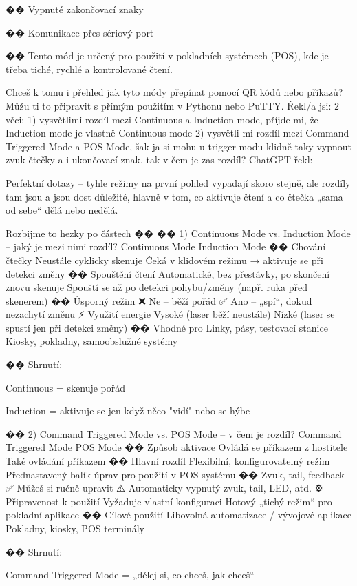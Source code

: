         �� Vypnuté zakončovací znaky

        �� Komunikace přes sériový port

�� Tento mód je určený pro použití v pokladních systémech (POS), kde je třeba tiché, rychlé a kontrolované čtení.

Chceš k tomu i přehled jak tyto módy přepínat pomocí QR kódů nebo příkazů? Můžu ti to připravit s přímým použitím v Pythonu nebo PuTTY.
Řekl/a jsi:
2 věci:
1) vysvětlimi rozdíl mezi Continuous a Induction mode, příjde mi, že Induction mode je vlastně Continuous mode
2) vysvětli mi rozdíl mezi Command Triggered Mode a POS Mode, šak ja si mohu u trigger modu klidně taky vypnout zvuk čtečky a i ukončovací znak, tak v čem je zas rozdíl?
ChatGPT řekl:

Perfektní dotazy – tyhle režimy na první pohled vypadají skoro stejně, ale rozdíly tam jsou a jsou dost důležité, hlavně v tom, co aktivuje čtení a co čtečka „sama od sebe“ dělá nebo nedělá.

Rozbijme to hezky po částech ��
�� 1) Continuous Mode vs. Induction Mode – jaký je mezi nimi rozdíl?
	Continuous Mode	Induction Mode
�� Chování čtečky	Neustále cyklicky skenuje	Čeká v klidovém režimu → aktivuje se při detekci změny
�� Spouštění čtení	Automatické, bez přestávky, po skončení znovu skenuje	Spouští se až po detekci pohybu/změny (např. ruka před skenerem)
�� Úsporný režim	❌ Ne – běží pořád	✅ Ano – „spí“, dokud nezachytí změnu
⚡ Využití energie	Vysoké (laser běží neustále)	Nízké (laser se spustí jen při detekci změny)
��️ Vhodné pro	Linky, pásy, testovací stanice	Kiosky, pokladny, samoobslužné systémy

�� Shrnutí:

    Continuous = skenuje pořád

    Induction = aktivuje se jen když něco "vidí" nebo se hýbe

��️ 2) Command Triggered Mode vs. POS Mode – v čem je rozdíl?
	Command Triggered Mode	POS Mode
�� Způsob aktivace	Ovládá se příkazem z hostitele	Také ovládání příkazem
�� Hlavní rozdíl	Flexibilní, konfigurovatelný režim	Přednastavený balík úprav pro použití v POS systému
�� Zvuk, tail, feedback	✅ Můžeš si ručně upravit	⚠️ Automaticky vypnutý zvuk, tail, LED, atd.
⚙️ Připravenost k použití	Vyžaduje vlastní konfiguraci	Hotový „tichý režim“ pro pokladní aplikace
�� Cílové použití	Libovolná automatizace / vývojové aplikace	Pokladny, kiosky, POS terminály

�� Shrnutí:

    Command Triggered Mode = „dělej si, co chceš, jak chceš“

